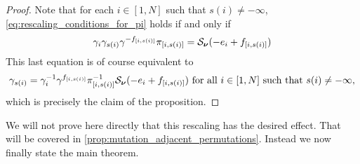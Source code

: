 \begin{proof}

	Note that for each $i \in [1, N]$ such that $s(i) \neq -\infty$,
	\cref{eq:rescaling_conditions_for_pi} holds if and only if
	\begin{equation*}
		\gamma_i \gamma_{s(i)} \gamma^{-f_{[i, s(i)]}}\pi_{[i, s(i)]} = \mathcal{S}_{\boldsymbol{\nu}}(-e_i + f_{[i, s(i)]})
	\end{equation*}
	This last equation is of course equivalent to
	\begin{equation*}
		\gamma_{s(i)} =  \gamma_{i}^{-1} \gamma^{f_{[i, s(i)]}}\pi_{[i, s(i)]}^{-1} \mathcal{S}_{\boldsymbol{\nu}}(-e_i + f_{[i, s(i)]}) \text{ for all } i \in [1, N] \text{ such that } s(i) \neq -\infty,
	\end{equation*}
	which is precisely the claim of the proposition.
\end{proof}

We will not prove here directly that this rescaling has the desired effect. That will
be covered in \cref{prop:mutation_adjacent_permutations}. Instead we now finally state
the main theorem.


